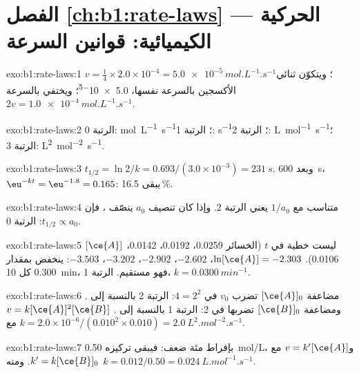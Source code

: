 \section*{الفصل \ref{ch:b1:rate-laws} --- الحركية الكيميائية: قوانين السرعة}

\begin{solution}{exo:b1:rate-laws:1}
$v = \frac14 \times 2.0 \times 10^{-4} = \qty{5.0e-5}{mol.L^{-1}.s^{-1}}$؛
ويتكوّن ثنائي الأكسجين بالسرعة نفسها، \qty{5.0e-5}{}؛ ويختفي  بالسرعة
$2v = \qty{1.0e-4}{mol.L^{-1}.s^{-1}}$.
\end{solution}

\begin{solution}{exo:b1:rate-laws:2}
الرتبة 0: \unit{mol.L^{-1}.s^{-1}}؛ الرتبة 1: \unit{s^{-1}}؛ الرتبة 2:
\unit{L.mol^{-1}.s^{-1}}؛ الرتبة 3: \unit{L^2.mol^{-2}.s^{-1}}.
\end{solution}

\begin{solution}{exo:b1:rate-laws:3}
$t_{1/2} = \ln2/k = 0.693/(3.0 \times 10^{-3}) = \qty{231}{s}$. وبعد
\qty{600}{s}، $\eu^{-kt} = \eu^{-1.8} = 0.165$: يبقى 16.5\,\%.
\end{solution}

\begin{solution}{exo:b1:rate-laws:4}
 متناسب مع $1/a_0$ يعني الرتبة 2. وإذا كان تنصيف $a_0$
ينصّف ، فإن $t_{1/2} \propto a_0$: الرتبة 0.
\end{solution}

\begin{solution}{exo:b1:rate-laws:5}
$[\ce{A}]$ ليست خطية في $t$ (الخسائر 0.0259، 0.0192، 0.0142، 0.0106).
$\ln[\ce{A}] = -2.303$، $-2.602$، $-2.902$، $-3.202$، $-3.503$: ينخفض
بمقدار 0.300 كل \qty{10}{min}، فهو مستقيم. الرتبة 1، $k =
\qty{0.0300}{min^{-1}}$.
\end{solution}

\begin{solution}{exo:b1:rate-laws:6}
مضاعفة $[\ce{A}]_0$ تضرب $v_0$ في $4 = 2^2$: الرتبة 2 بالنسبة إلى .
ومضاعفة $[\ce{B}]_0$ تضربها في 2: الرتبة 1 بالنسبة إلى . $v =
k[\ce{A}]^2[\ce{B}]$ مع $k = 2.0 \times 10^{-6}/(0.010^2 \times 0.010) =
\qty{2.0}{L^2.mol^{-2}.s^{-1}}$.
\end{solution}

\begin{solution}{exo:b1:rate-laws:7}
 بإفراط مئة ضعف: فيبقى تركيزه
\qty{0.50}{mol/L}، و$v = k'[\ce{A}]$ مع $k' = k[\ce{B}]_0$. ومنه
$k = 0.012/0.50 = \qty{0.024}{L.mol^{-1}.s^{-1}}$.
\end{solution}


